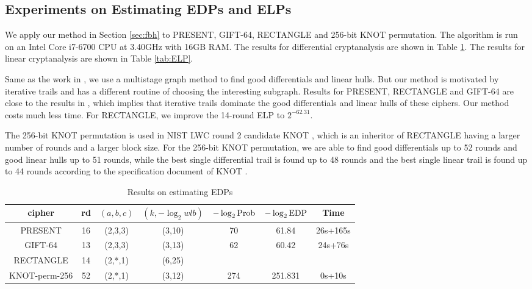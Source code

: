 \subsection{Experiments on Estimating EDPs and ELPs}

We apply our method in Section \ref{sec:fbh} to PRESENT, GIFT-64, RECTANGLE and 256-bit KNOT permutation. The algorithm is run on an Intel Core i7-6700 CPU at 3.40GHz with 16GB RAM. The results for differential cryptanalysis are shown in Table \ref{tab:EDP}. The results for linear cryptanalysis are shown in Table \ref{tab:ELP}. 

Same as the work in \cite{HV18}, we use a multistage graph method to find good differentials and linear hulls. But our method is motivated by iterative trails and has a different routine of choosing the interesting subgraph. Results for PRESENT, RECTANGLE and GIFT-64 are close to the results in \cite{HV18}, which implies that iterative trails dominate the good differentials and linear hulls of these ciphers. Our method costs much less time. For RECTANGLE, we improve the 14-round ELP to $2^{-62.31}$. 

The 256-bit KNOT permutation is used in NIST LWC round 2 candidate KNOT \cite{ZDY19}, which is an inheritor of RECTANGLE having a larger number of rounds and a larger block size. For the 256-bit KNOT permutation, we are able to find good differentials up to 52 rounds and good linear hulls up to 51 rounds, while the best single differential trail is found up to 48 rounds and the best single linear trail is found up to 44 rounds according to the specification document of KNOT \cite{ZDY19}. 

\begin{table}
	\caption{Results on estimating EDPs}\label{tab:EDP}
	\centering
	\begin{tabular}{|c|c|c|c|c|c|c|}
		\hline
		cipher & rd & $(a,b,c)$ & $(k,-\log_2wlb)$ & $-\log_2\text{Prob}$ & $-\log_2\text{EDP}$ & Time \\
		\hline
		PRESENT & 16 & (2,3,3) & (3,10) & 70 & 61.84 & 26s+165s\\
		\hline
		GIFT-64 & 13 & (2,3,3) & (3,13) & 62 & 60.42 & 24s+76s\\
		\hline 
		RECTANGLE & 14 & (2,*,1) & (6,25) &  &  &  \\
		\hline
		KNOT-perm-256 & 52 & (2,*,1) & (3,12) & 274 & 251.831 & 0s+10s\\
		\hline
	\end{tabular}
\end{table}

